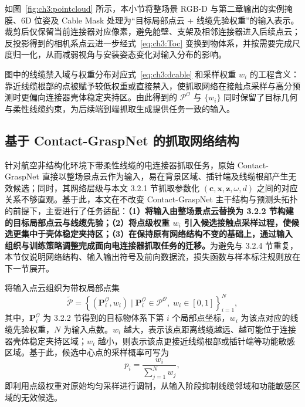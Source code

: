 如图~\ref{fig:ch3:pointcloud} 所示，本小节将整场景 RGB-D 与第二章输出的实例掩膜、6D 位姿及 Cable Mask 处理为“目标局部点云 + 线缆先验权重”的输入表示。裁剪后仅保留当前连接器对应像素，避免舱壁、支架及相邻连接器进入后续点云；反投影得到的相机系点云进一步经式~\eqref{eq:ch3:Toc} 变换到物体系，并按需要完成尺度归一化，从而减弱视角与安装姿态变化对输入分布的影响。

图中的线缆禁入域与权重分布对应式~\eqref{eq:ch3:dcable} 和采样权重 $w_i$ 的工程含义：靠近线缆根部的点被赋予较低权重或直接禁入，使抓取网络在接触点采样与高分预测时更偏向连接器壳体稳定夹持区。由此得到的 $\mathcal{P}^{\mathcal{O}}$ 与 $\{w_i\}$ 同时保留了目标几何与柔性线缆约束，为后续端到端抓取生成提供任务一致的输入。

\subsection{基于 Contact-GraspNet 的抓取网络结构}

针对航空非结构化环境下带柔性线缆的电连接器抓取任务，原始 Contact-GraspNet 直接以整场景点云作为输入，易在背景区域、插针端及线缆根部产生无效候选；同时，其网络层级与本文 3.2.1 节抓取参数化 $(\mathbf{c},\mathbf{x},\mathbf{z},\omega,d)$ 之间的对应关系不够直观。基于此，本文在不改变 Contact-GraspNet 主干结构与预测头拓扑的前提下，主要进行了任务适配：\textbf{（1）将输入由整场景点云替换为 3.2.2 节构建的目标局部点云与线缆先验；（2）将点级权重 $w_i$ 引入候选接触点采样过程，使候选更集中于壳体稳定夹持区；（3）在保持原有网络结构不变的基础上，通过输入组织与训练策略调整完成面向电连接器抓取任务的迁移。}为避免与 3.2.4 节重复，本节仅说明网络结构、输入输出符号及前向数据流，损失函数与样本标注规则放在下一节展开。

将输入点云组织为带权局部点集
\begin{equation}
  \tilde{\mathcal{P}}=
  \left\{
  \left(\mathbf{P}_i^{\mathcal{O}},w_i\right)
  \mid
  \mathbf{P}_i^{\mathcal{O}}\in\mathcal{P}^{\mathcal{O}},\;
  w_i\in[0,1]
  \right\}_{i=1}^{N},
  \label{eq:ch3:weighted-input}
\end{equation}
其中，$\mathbf{P}_i^{\mathcal{O}}$ 为 3.2.2 节得到的目标物体系下第 $i$ 个局部点坐标，$w_i$ 为该点对应的线缆先验权重，$N$ 为输入点数。$w_i$ 越大，表示该点距离线缆越远、越可能位于连接器壳体稳定夹持区域；$w_i$ 越小，则表示该点更接近线缆根部或插针端等功能敏感区域。基于此，候选中心点的采样概率可写为
\begin{equation}
  p_i=\frac{w_i}{\sum_{j=1}^{N}w_j},
  \label{eq:ch3:sample-prob}
\end{equation}
即利用点级权重对原始均匀采样进行调制，从输入阶段抑制线缆邻域和功能敏感区域的无效候选。

